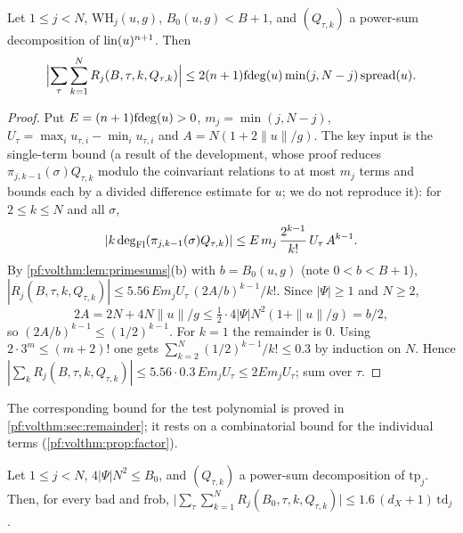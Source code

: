 \begin{proposition}\label{pf:volthm:prop:remlin}
Let $1\le j<N$, $\mathrm{WH}_j(u,g)$, $B_0(u,g)<B+1$, and $(Q_{\tau,k})$ a power-sum decomposition of
$\mathrm{lin}(u)^{n+1}$. Then
\[
\Bigl|\sum_\tau\sum_{k=1}^NR_j(B,\tau,k,Q_{\tau,k})\Bigr|\le2(n+1)\mathrm{fdeg}(u)\min(j,N-j)\,\mathrm{spread}(u).
\]
\end{proposition}

\begin{proof}
Put $E=(n+1)\mathrm{fdeg}(u)>0$, $m_j=\min(j,N-j)$, $U_\tau=\max_iu_{\tau,i}-\min_iu_{\tau,i}$ and
$A=N(1+2\|u\|/g)$. The key input is the single-term bound
 (a result of the development, whose proof reduces
$\pi_{j,k-1}(\sigma)Q_{\tau,k}$ modulo the coinvariant relations to at most $m_j$ terms and bounds each by a divided
difference estimate for $u$; we do not reproduce it): for $2\le k\le N$ and all $\sigma$,
\[
|k\deg_{\mathrm{Fl}}(\pi_{j,k-1}(\sigma)Q_{\tau,k})|\le E\,m_j\,\frac{2^{k-1}}{k!}\,U_\tau\,A^{k-1}.
\]
By \cref{pf:volthm:lem:primesums}(b) with $b=B_0(u,g)$ (note $0<b<B+1$),
$|R_j(B,\tau,k,Q_{\tau,k})|\le5.56\,Em_jU_\tau\,(2A/b)^{k-1}/k!$. Since $|\Psi|\ge1$ and $N\ge2$,
\[
2A=2N+4N\|u\|/g\le\tfrac12\cdot4|\Psi|N^2(1+\|u\|/g)=b/2,
\]
so $(2A/b)^{k-1}\le(1/2)^{k-1}$. For $k=1$ the
remainder is $0$. Using $2\cdot3^m\le(m+2)!$ one gets $\sum_{k=2}^N(1/2)^{k-1}/k!\le0.3$ by induction on $N$. Hence
$|\sum_kR_j(B,\tau,k,Q_{\tau,k})|\le5.56\cdot0.3\,Em_jU_\tau\le2Em_jU_\tau$; sum over $\tau$.
\end{proof}

The corresponding bound for the test polynomial is proved in \cref{pf:volthm:sec:remainder}; it rests on a
combinatorial bound for the individual terms (\cref{pf:volthm:prop:factor}).

\begin{proposition}\label{pf:volthm:prop:remtest}
Let $1\le j<N$, $4|\Psi|N^2\le B_0$, and $(Q_{\tau,k})$ a power-sum decomposition of $\mathrm{tp}_j$. Then, for every
$\mathrm{bad}$ and $\mathrm{frob}$,
$\bigl|\sum_\tau\sum_{k=1}^NR_j(B_0,\tau,k,Q_{\tau,k})\bigr|\le1.6\,(d_X+1)\,\mathrm{td}_j$.
\end{proposition}

